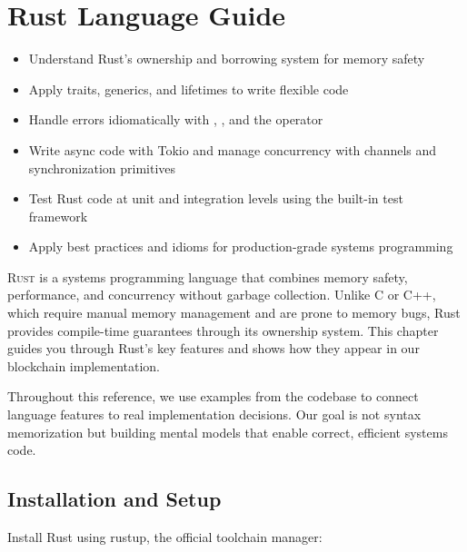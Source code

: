
\chapter{Rust Language Guide}
\label{ch:rust-guide}

\begin{learnbox}
\begin{itemize}
  \item Understand Rust's ownership and borrowing system for memory safety
  \item Apply traits, generics, and lifetimes to write flexible code
  \item Handle errors idiomatically with , , and the  operator
  \item Write async code with Tokio and manage concurrency with channels and synchronization primitives
  \item Test Rust code at unit and integration levels using the built-in test framework
  \item Apply best practices and idioms for production-grade systems programming
\end{itemize}
\end{learnbox}

\lettrine[lines=3]{R}{ust} is a systems programming language that combines memory safety, performance, and concurrency without garbage collection. Unlike C or C++, which require manual memory management and are prone to memory bugs, Rust provides compile-time guarantees through its ownership system. This chapter guides you through Rust's key features and shows how they appear in our blockchain implementation.

Throughout this reference, we use examples from the codebase to connect language features to real implementation decisions. Our goal is not syntax memorization but building mental models that enable correct, efficient systems code.

\section{Installation and Setup}
\label{sec:ch24-install-setup}

Install Rust using rustup, the official toolchain manager:

